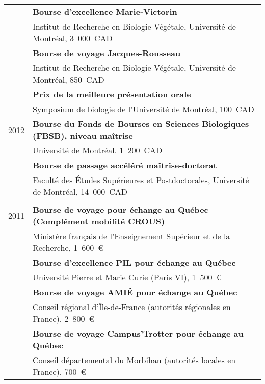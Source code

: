 \documentclass[letterpaper,10pt]{article}
\begin{document}
{\begin{tabular}{r|p{14cm}}
& \textbf{Bourse d'excellence Marie-Victorin} \\
& Institut de Recherche en Biologie Végétale, Université de Montréal, 3~000~CAD  \vspace{1.3mm} \\

& \textbf{Bourse de voyage Jacques-Rousseau} \\
& Institut de Recherche en Biologie Végétale, Université de Montréal, 850~CAD  \vspace{1.3mm} \\

& \textbf{Prix de la meilleure présentation orale} \\
& Symposium de biologie de l'Université de Montréal, 100~CAD\\

2012

& \textbf{Bourse du Fonds de Bourses en Sciences Biologiques (FBSB), niveau maîtrise} \\
& Université de Montréal, 1~200~CAD  \vspace{1.3mm} \\

& \textbf{Bourse de passage accéléré maîtrise-doctorat} \\
& Faculté des Études Supérieures et Postdoctorales, Université de Montréal, 14~000~CAD \\

\multicolumn{2}{c}{} \\

2011

& \textbf{Bourse de voyage pour échange au Québec (Complément mobilité CROUS)} \\
& Ministère français de l'Enseignement Supérieur et de la Recherche, 1~600~€  \vspace{1.3mm} \\

& \textbf{Bourse d'excellence PIL pour échange au Québec} \\
& Université Pierre et Marie Curie (Paris VI), 1~500~€  \vspace{1.3mm} \\

& \textbf{Bourse de voyage AMIÉ pour échange au Québec} \\
& Conseil régional d'Île-de-France (autorités régionales en France), 2~800~€  \vspace{1.3mm} \\

& \textbf{Bourse de voyage Campus'Trotter pour échange au Québec} \\
& Conseil départemental du Morbihan (autorités locales en France), 700~€\\


\end{tabular}}
\end{document}
